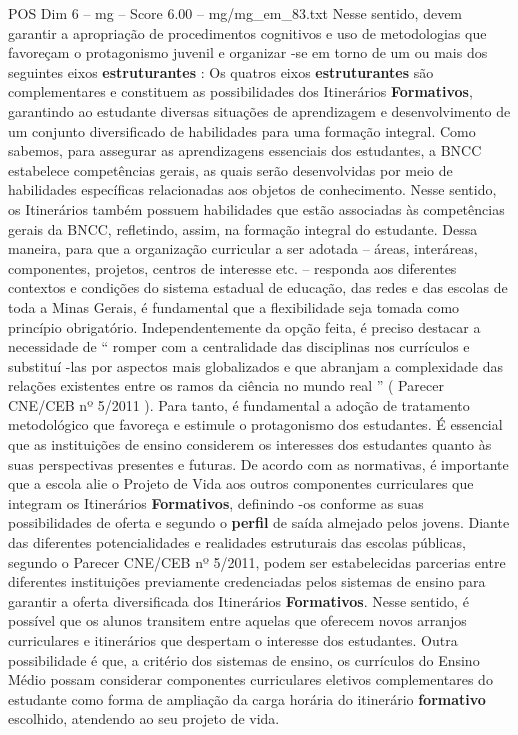 \begin{textsample}{POS Dim 6 – mg – Score 6.00 – mg/mg\_em\_83.txt}
Nesse sentido, devem garantir a apropriação de procedimentos cognitivos e uso de metodologias que favoreçam o protagonismo juvenil e organizar -se em torno de um ou mais dos seguintes eixos \textbf{estruturantes} : Os quatros eixos \textbf{estruturantes} são complementares e constituem as possibilidades dos Itinerários \textbf{Formativos}, garantindo ao estudante diversas situações de aprendizagem e desenvolvimento de um conjunto diversificado de habilidades para uma formação integral.
Como sabemos, para assegurar as aprendizagens essenciais dos estudantes, a BNCC estabelece competências gerais, as quais serão desenvolvidas por meio de habilidades específicas relacionadas aos objetos de conhecimento.
Nesse sentido, os Itinerários também possuem habilidades que estão associadas às competências gerais da BNCC, refletindo, assim, na formação integral do estudante.
Dessa maneira, para que a organização curricular a ser adotada – áreas, interáreas, componentes, projetos, centros de interesse etc. – responda aos diferentes contextos e condições do sistema estadual de educação, das redes e das escolas de toda a Minas Gerais, é fundamental que a flexibilidade seja tomada como princípio obrigatório.
Independentemente da opção feita, é preciso destacar a necessidade de “ romper com a centralidade das disciplinas nos currículos e substituí -las por aspectos mais globalizados e que abranjam a complexidade das relações existentes entre os ramos da ciência no mundo real ” ( Parecer CNE/CEB nº 5/2011 ).
Para tanto, é fundamental a adoção de tratamento metodológico que favoreça e estimule o protagonismo dos estudantes.
É essencial que as instituições de ensino considerem os interesses dos estudantes quanto às suas perspectivas presentes e futuras.
De acordo com as normativas, é importante que a escola alie o Projeto de Vida aos outros componentes curriculares que integram os Itinerários \textbf{Formativos}, definindo -os conforme as suas possibilidades de oferta e segundo o \textbf{perfil} de saída almejado pelos jovens.
Diante das diferentes potencialidades e realidades estruturais das escolas públicas, segundo o Parecer CNE/CEB nº 5/2011, podem ser estabelecidas parcerias entre diferentes instituições previamente credenciadas pelos sistemas de ensino para garantir a oferta diversificada dos Itinerários \textbf{Formativos}.
Nesse sentido, é possível que os alunos transitem entre aquelas que oferecem novos arranjos curriculares e itinerários que despertam o interesse dos estudantes.
Outra possibilidade é que, a critério dos sistemas de ensino, os currículos do Ensino Médio possam considerar componentes curriculares eletivos complementares do estudante como forma de ampliação da carga horária do itinerário \textbf{formativo} escolhido, atendendo ao seu projeto de vida.

\end{textsample}

